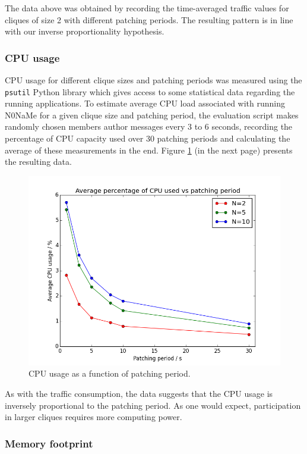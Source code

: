 \documentclass[a4paper, 12pt]{report}
\newcommand{\funkytt}{\fontfamily{AnonymousPro}\selectfont}
\begin{document}
The data above was obtained by recording the time-averaged traffic values for cliques of size 2 with different patching periods. The resulting pattern is in line with our inverse proportionality hypothesis.

\subsubsection{CPU usage}
CPU usage for different clique sizes and patching periods was measured using the \texttt{psutil} Python library which gives access to some statistical data regarding the running applications. To estimate average CPU load associated with running {\funkytt N0NaMe} for a given clique size and patching period, the evaluation script makes randomly chosen members author messages every 3 to 6 seconds, recording the percentage of CPU capacity used over 30 patching periods and calculating the average of these measurements in the end. Figure \ref{fig:cpu_vs_period} (in the next page) presents the resulting data. \\

\begin{figure}[h]
    \captionsetup{width=0.9\textwidth}
    \centering
    \includegraphics[width=0.78\linewidth]{pics/eval/cpu_vs_period.png}
    \caption{\label{fig:cpu_vs_period} CPU usage as a function of patching period.}
\end{figure}

As with the traffic consumption, the data suggests that the CPU usage is inversely proportional to the patching period. As one would expect, participation in larger cliques requires more computing power.

\subsubsection{Memory footprint}
\end{document}
